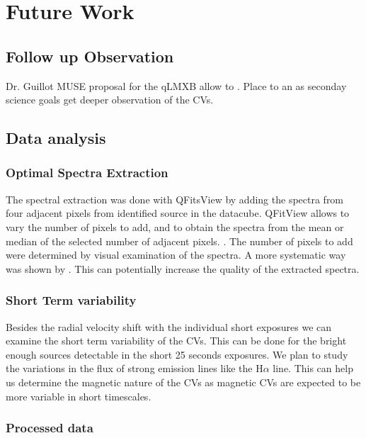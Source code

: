 \chapter{Future Work}\label{chap:future}
\thispagestyle{fancy}

\section{Follow up Observation}

    Dr. Guillot MUSE proposal for the qLMXB allow to . Place to an as seconday science goals get deeper observation of the CVs. 
    
\section{Data analysis}

\subsection{Optimal Spectra Extraction}

The spectral extraction was done with QFitsView by adding the spectra from four adjacent pixels from identified source in the datacube. QFitView allows to vary the number of pixels to add, and to obtain the spectra from the mean or median of the selected number of adjacent pixels. . The number of pixels to add were determined by visual examination of the spectra. A more systematic way was shown by \cite{horne_emission_1986}. This can potentially increase the quality of the extracted spectra. 

\subsection{Short Term variability}

Besides the radial velocity shift with the individual short exposures we can examine the short term variability of the CVs. This can be done for the bright enough sources detectable in the short 25 seconds exposures. We plan to study the variations in the flux of strong emission lines like the H$\alpha$ line. This can help us determine the magnetic nature of the CVs as magnetic CVs are expected to be more variable in short timescales. 

\subsection{Processed data}

